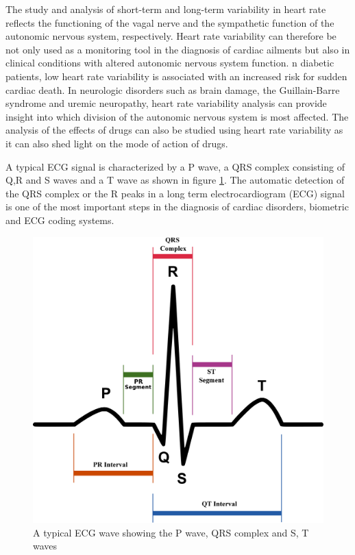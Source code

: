 \documentclass[11pt]{article}
\theoremstyle{definition}
\begin{document}
  The study and analysis of short-term and long-term variability in heart rate reflects the functioning of the vagal nerve and the sympathetic function of the autonomic nervous system, respectively.
  Heart rate variability can therefore be not only used as a monitoring tool in the diagnosis of cardiac ailments but also in clinical conditions with altered autonomic nervous system function.
  n diabetic patients, low heart rate variability is associated with an increased risk for sudden cardiac death.
  In neurologic disorders such as brain damage, the Guillain-Barre syndrome and uremic neuropathy, heart rate variability analysis can provide insight into which division of the autonomic nervous system is most affected.
  The analysis of the effects of drugs can also be studied using heart rate variability as it can also shed light on the mode of action of drugs.

  A typical ECG signal is characterized by a P wave, a QRS complex consisting of Q,R and S waves and a T wave as shown in figure \ref{fig:pqrst}.
  The automatic detection of the QRS complex or the R peaks in a long term electrocardiogram (ECG) signal is one of the most important steps in the diagnosis of cardiac disorders, biometric and ECG coding systems.

  \begin{figure}[h]
    \centering
    \includegraphics[scale=0.2]{images/SinusRhythmLabels.jpg}
    \caption{A typical ECG wave showing the P wave, QRS complex and S, T waves\cite{wiki:SinusRythmLabels}}
    \label{fig:pqrst}
  \end{figure}
\end{document}
